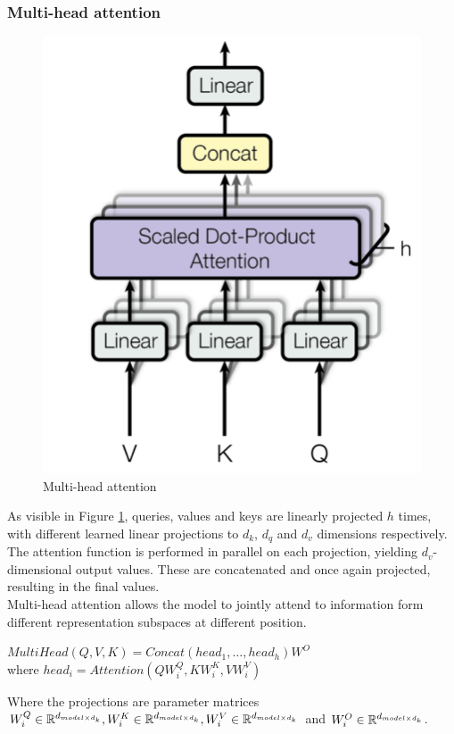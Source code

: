 \documentclass[\main/main.tex]{subfiles}
\begin{document}
\subsubsection{Multi-head attention}
\begin{figure}[h]
    \centering
    \includegraphics[scale=0.25]{images/transformer/multi-headed_attention.jpeg}
    \caption{Multi-head attention}
    \label{fig:multi-head_attention}
\end{figure}
As visible in Figure \ref{fig:multi-head_attention}, queries, values and keys are linearly projected $h$ times, with different learned linear projections to $d_k$, $d_q$ and $d_v$ dimensions respectively. The attention function is performed in parallel on each projection, yielding $d_v$-dimensional output values. These are concatenated and once again projected, resulting in the final values. \\
Multi-head attention allows the model to jointly attend to information form different representation subspaces at different position. 
\begin{center}
    $MultiHead(Q, V, K) = Concat(head_1, \dots, head_h)W^O$\\
    where $head_i = Attention(QW^Q_i, KW^K_i, VW^V_i)$
\end{center}
Where the projections are parameter matrices $W^Q_i\in\mathbb{R}^{d_{model \times d_k}}, W^K_i\in\mathbb{R}^{d_{model \times d_k}}, W^V_i\in\mathbb{R}^{d_{model \times d_k}}$ and $ W^O_i\in\mathbb{R}^{d_{model \times d_k}}$.
\end{document}
